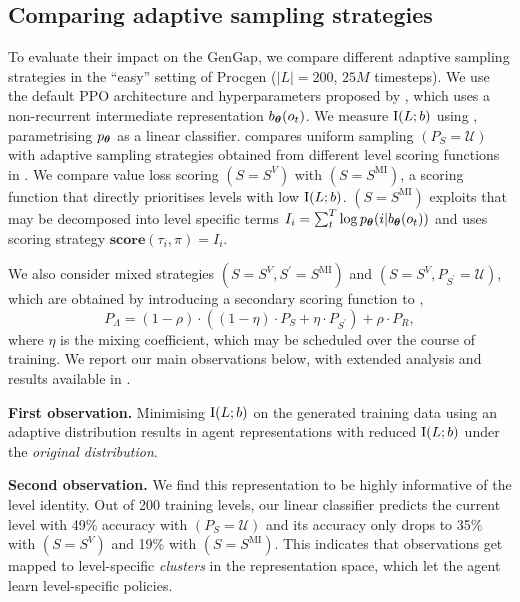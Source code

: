 \subsection{Comparing adaptive sampling strategies} \label{c3:sec:procgen_exp}
To evaluate their impact on the $\text{GenGap}$, we compare different adaptive sampling strategies in the ``easy'' setting of Procgen ($|L|=200$, $25M$ timesteps).  We use the default PPO \citep{PPO} architecture and hyperparameters proposed by \citet{procgen}, which uses a non-recurrent intermediate representation $b_{\bm{\theta}} (o_t)$. We measure $\text{I}(L;b)$ using , parametrising $p_{\bm{\theta}}$ as a linear classifier.
 compares uniform sampling $(P_S=\mathcal{U})$ with adaptive sampling strategies obtained from different level scoring functions in . We compare value loss scoring $(S=S^V)$ with $(S=S^{\text{MI}})$, a scoring function that directly prioritises levels with low $\text{I}(L;b)$. $(S=S^{\text{MI}})$ exploits that  may be decomposed into level specific terms $I_i = \sum_{t}^T \log p_{\bm{\theta}}(i|b_{\bm{\theta}}(o_t))$ and uses scoring strategy $\textbf{score}(\tau_i, \pi) = I_i$. 

We also consider mixed strategies $(S=S^V, S^\prime=S^{\text{MI}})$ and $(S=S^V, P_{S^\prime}=\mathcal{U})$, which are obtained by introducing a secondary scoring function to ,
\begin{equation} \label{c3:eq:buffer_dist}
    P_\Lambda = (1 - \rho) \cdot ((1-\eta) \cdot  P_S + \eta \cdot P_{S^\prime}) + \rho \cdot P_R,
\end{equation}
where $\eta$ is the mixing coefficient, which may be scheduled over the course of training. We report our main observations below, with extended analysis and results available in .
    
    \textbf{First observation.} Minimising $\text{I}(L;b)$ on the generated training data using an adaptive distribution results in agent representations with reduced $\text{I}(L;b)$ under the \textit{original distribution}.
    
    \textbf{Second observation.} We find this representation to be highly informative of the level identity. Out of 200 training levels, our linear classifier predicts the current level with 49\% accuracy with $(P_S=\mathcal{U})$ and its accuracy only drops to 35\% with $(S=S^V)$ and 19\% with $(S=S^{\text{MI}})$. This indicates that observations get mapped to level-specific \textit{clusters} in the representation space, which let the agent learn level-specific policies.
    

